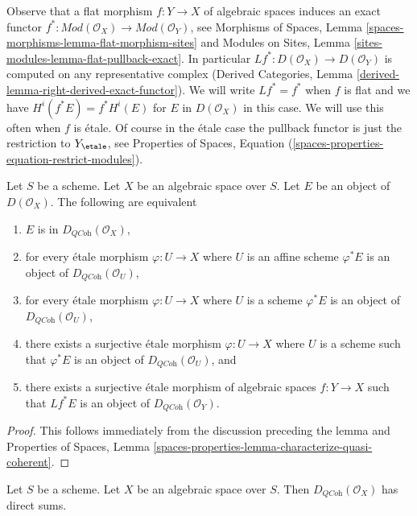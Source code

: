 \medskip\noindent
Observe that a flat morphism $f : Y \to X$ of algebraic spaces
induces an exact functor
$f^* : \textit{Mod}(\mathcal{O}_X) \to \textit{Mod}(\mathcal{O}_Y)$,
see
Morphisms of Spaces, Lemma \ref{spaces-morphisms-lemma-flat-morphism-sites}
and
Modules on Sites, Lemma \ref{sites-modules-lemma-flat-pullback-exact}.
In particular $Lf^* : D(\mathcal{O}_X) \to D(\mathcal{O}_Y)$
is computed on any representative complex
(Derived Categories, Lemma \ref{derived-lemma-right-derived-exact-functor}).
We will write $Lf^* = f^*$ when $f$ is flat and we have
$H^i(f^*E) = f^*H^i(E)$ for $E$ in $D(\mathcal{O}_X)$ in this case.
We will use this often when $f$ is \'etale. Of course in the \'etale
case the pullback functor is just the restriction to $Y_\etale$,
see Properties of Spaces, Equation
(\ref{spaces-properties-equation-restrict-modules}).

\begin{lemma}
\label{lemma-check-quasi-coherence-on-covering}
Let $S$ be a scheme. Let $X$ be an algebraic space over $S$.
Let $E$ be an object of $D(\mathcal{O}_X)$. The following are equivalent
\begin{enumerate}
\item $E$ is in $D_{\textit{QCoh}}(\mathcal{O}_X)$,
\item for every \'etale morphism $\varphi : U \to X$ where $U$ is an
affine scheme $\varphi^*E$ is an object of
$D_{\textit{QCoh}}(\mathcal{O}_U)$,
\item for every \'etale morphism $\varphi : U \to X$ where $U$ is a scheme
$\varphi^*E$ is an object of
$D_{\textit{QCoh}}(\mathcal{O}_U)$,
\item there exists a surjective \'etale morphism $\varphi : U \to X$
where $U$ is a scheme such that $\varphi^*E$ is an object of
$D_{\textit{QCoh}}(\mathcal{O}_U)$, and
\item there exists a surjective \'etale morphism of algebraic spaces
$f : Y \to X$ such that $Lf^*E$ is an object of
$D_{\textit{QCoh}}(\mathcal{O}_Y)$.
\end{enumerate}
\end{lemma}

\begin{proof}
This follows immediately from the discussion preceding the lemma and
Properties of Spaces, Lemma
\ref{spaces-properties-lemma-characterize-quasi-coherent}.
\end{proof}

\begin{lemma}
\label{lemma-quasi-coherence-direct-sums}
Let $S$ be a scheme. Let $X$ be an algebraic space over $S$.
Then $D_{\textit{QCoh}}(\mathcal{O}_X)$ has direct sums.
\end{lemma}

